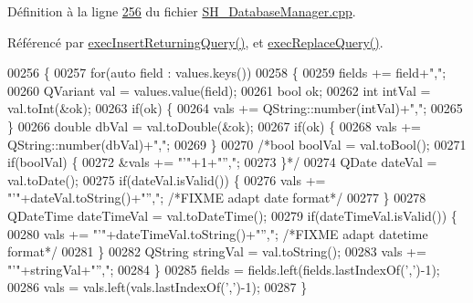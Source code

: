 Définition à la ligne \hyperlink{SH__DatabaseManager_8cpp_source_l00256}{256} du fichier \hyperlink{SH__DatabaseManager_8cpp_source}{S\-H\-\_\-\-Database\-Manager.\-cpp}.



Référencé par \hyperlink{classSH__DatabaseManager_a55268fae16792142072af49238f7bb94}{exec\-Insert\-Returning\-Query()}, et \hyperlink{classSH__DatabaseManager_a25e0f24d7833c2728f55b85be529063d}{exec\-Replace\-Query()}.


\begin{DoxyCode}
00256                                                                                              \{
00257     \textcolor{keywordflow}{for}(\textcolor{keyword}{auto} field : values.keys())
00258     \{
00259         fields += field+\textcolor{stringliteral}{","};
00260         QVariant val = values.value(field);
00261         \textcolor{keywordtype}{bool} ok;
00262         \textcolor{keywordtype}{int} intVal = val.toInt(&ok);
00263         \textcolor{keywordflow}{if}(ok) \{
00264             vals += QString::number(intVal)+\textcolor{stringliteral}{","};
00265         \}
00266         \textcolor{keywordtype}{double} dbVal = val.toDouble(&ok);
00267         \textcolor{keywordflow}{if}(ok) \{
00268             vals += QString::number(dbVal)+\textcolor{stringliteral}{","};
00269         \}
00270         \textcolor{comment}{/*bool boolVal = val.toBool();
}
00271 \textcolor{comment}{                if(boolVal) \{
}
00272 \textcolor{comment}{                    &vals += "'"+1+"'',";
}
00273 \textcolor{comment}{                \}*/}
00274         QDate dateVal = val.toDate();
00275         \textcolor{keywordflow}{if}(dateVal.isValid()) \{
00276             vals += \textcolor{stringliteral}{"'"}+dateVal.toString()+\textcolor{stringliteral}{"'',"}; \textcolor{comment}{/*FIXME adapt date format*/}
00277         \}
00278         QDateTime dateTimeVal = val.toDateTime();
00279         \textcolor{keywordflow}{if}(dateTimeVal.isValid()) \{
00280             vals += \textcolor{stringliteral}{"'"}+dateTimeVal.toString()+\textcolor{stringliteral}{"'',"}; \textcolor{comment}{/*FIXME adapt datetime format*/}
00281         \}
00282         QString stringVal = val.toString();
00283         vals += \textcolor{stringliteral}{"'"}+stringVal+\textcolor{stringliteral}{"'',"};
00284     \}
00285     fields = fields.left(fields.lastIndexOf(\textcolor{charliteral}{','})-1);
00286     vals = vals.left(vals.lastIndexOf(\textcolor{charliteral}{','})-1);
00287 \}
\end{DoxyCode}
